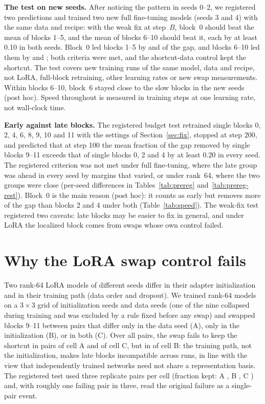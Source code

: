 \textbf{The test on new seeds.} After noticing the pattern in seeds 0--2, we registered two predictions and trained
two new full fine-tuning models (seeds 3 and 4) with the same data and recipe: with the weak fix at step~$B$, block~0
should beat the mean of blocks 1--5, and the mean of blocks 6--10 should beat it, each by at least 0.10 in both seeds.
Block~0 led blocks 1--5 by \lSevenRuleOneFullFTsThree{} and \lSevenRuleOneFullFTsFour{} of the gap, and blocks 6--10
led them by \lSevenRuleTwoFullFTsThree{} and \lSevenRuleTwoFullFTsFour; both criteria were met, and the shortcut-data
control kept the shortcut. The test covers new training runs of the same model, data and recipe, not LoRA, full-block
retraining, other learning rates or new swap measurements. Within blocks 6--10, block~6 stayed close to the slow blocks
in the new seeds (post hoc). Speed throughout is measured in training steps at one learning rate, not wall-clock time.

\textbf{Early against late blocks.} The registered budget test retrained single blocks 0, 2, 4, 6, 8, 9, 10 and 11
with the settings of Section~\ref{sec:fix}, stopped at step 200, and predicted that at step 100 the mean fraction of
the gap removed by single blocks 9--11 exceeds that of single blocks 0, 2 and 4 by at least 0.20 in every seed. The
registered criterion was not met under full fine-tuning, where the late group was ahead in every seed by margins that
varied, or under rank~64, where the two groups were close (per-seed differences in Tables~\ref{tab:prereg}
and~\ref{tab:prereg-rest}). Block~0 is the main reason (post hoc): it counts as early but removes more of the gap than
blocks 2 and 4 under both (Table~\ref{tab:speed}). The weak-fix test registered two caveats: late blocks may be easier to fix in general, and
under LoRA the localized block comes from swaps whose own control failed.

\section{Why the LoRA swap control fails}
\label{app:lora-grid}
Two rank-64 LoRA models of different seeds differ in their adapter initialization and in their training path (data
order and dropout). We trained rank-64 models on a $3\times3$ grid of initialization seeds and data seeds (one of the
nine collapsed during training and was excluded by a rule fixed before any swap) and swapped blocks 9--11 between pairs
that differ only in the data seed (A), only in the initialization (B), or in both (C). Over all pairs, the swap fails to
keep the shortcut in \lFiveFailPairsCellA{} pairs of cell A and \lFiveFailPairsCellC{} of cell C, but in
\lFiveFailPairsCellB{} of cell B: the training path, not the initialization, makes late blocks incompatible across
runs, in line with the view that independently trained networks need not share a representation basis. The registered
test used three replicate pairs per cell (fraction kept: A \lFiveKeptCellARange, B \lFiveKeptCellBRange, C
\lFiveKeptCellCRange) and, with roughly one failing pair in three, read the original failure as a single-pair event.

